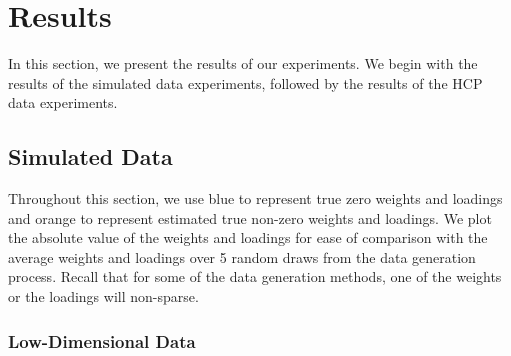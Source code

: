 %

\section{Results}

In this section, we present the results of our experiments.
We begin with the results of the simulated data experiments, followed by the results of the HCP data experiments.

\subsection{Simulated Data}

Throughout this section, we use blue to represent true zero weights and loadings and orange to represent estimated true non-zero weights and loadings.
We plot the absolute value of the weights and loadings for ease of comparison with the average weights and loadings over 5 random draws from the data generation process.
Recall that for some of the data generation methods, one of the weights or the loadings will non-sparse.

\subsubsection{Low-Dimensional Data}

